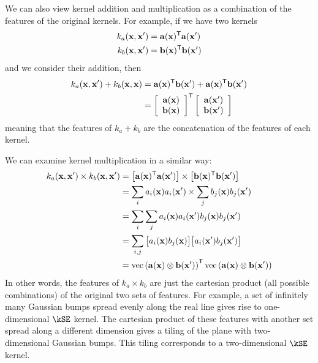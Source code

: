 We can also view kernel addition and multiplication as a combination of the features of the original kernels.
For example, if we have two kernels
%
\begin{align}
k_a({\bf{x}}, {\bf{x}}') & = {\bf{a}}({\bf{x}})^{\mathsf{T}} {\bf{a}}({\bf{x}}')\\
k_b({\bf{x}}, {\bf{x}}') & = {\bf{b}}({\bf{x}})^{\mathsf{T}} {\bf{b}}({\bf{x}}')
\end{align}
%
and we consider their addition, then
%
\begin{align}
k_a({\bf{x}}, {\bf{x}}') + k_b({\bf{x}}, {\bf{x}})
& = {\bf{a}}({\bf{x}})^{\mathsf{T}} {\bf{b}}({\bf{x}}') + {\bf{a}}({\bf{x}})^{\mathsf{T}} {\bf{b}}({\bf{x}}') \\
& = \left[ \begin{array}{c} {{\bf{a}}({\bf{x}})} \\ {{\bf{b}}({\bf{x}})} \end{array} \right]^{\mathsf{T}} \left[ \begin{array}{c} {{\bf{a}}({\bf{x}}')} \\ {{\bf{b}}({\bf{x}}')} \end{array} \right]
\end{align}
%
meaning that the features of $k_a + k_b$ are the concatenation of the features of each kernel.

We can examine kernel multiplication in a similar way:
%
\begin{align}
k_a({\bf{x}}, {\bf{x}}') \times k_b({\bf{x}}, {\bf{x}}')
& = \left[ {\bf{a}}({\bf{x}})^{\mathsf{T}} {\bf{a}}({\bf{x}}') \right] \times \left[ {\bf{b}}({\bf{x}})^{\mathsf{T}} {\bf{b}}({\bf{x}}') \right] \\
& = \sum_i a_i({\bf{x}}) a_i({\bf{x}}') \times \sum_j b_j({\bf{x}}) b_j({\bf{x}}') \\
& = \sum_i \sum_j a_i({\bf{x}}) a_i({\bf{x}}') b_j({\bf{x}}) b_j({\bf{x}}') \\
& = \sum_{i,j} \big[ a_i({\bf{x}}) b_j({\bf{x}}) \big] \big[ a_i({\bf{x}}') b_j({\bf{x}}') \big] \\
& = \operatorname{vec} \left( { {\bf{a}}({\bf{x}}) \otimes {\bf{b}}({\bf{x}}') } \right) ^{\mathsf{T}} \operatorname{vec} \left( { {\bf{a}}({\bf{x}}) \otimes {\bf{b}}({\bf{x}}')} \right) 
\end{align}
%
In other words, the features of $k_a \times k_b$ are just the cartesian product (all possible combinations) of the original two sets of features.
For example, a set of infinitely many Gaussian bumps spread evenly along the real line gives rise to one-dimensional $\kSE$ kernel.
The cartesian product of these features with another set spread along a different dimension gives a tiling of the plane with two-dimensional Gaussian bumps.
This tiling corresponds to a two-dimensional $\kSE$ kernel.






